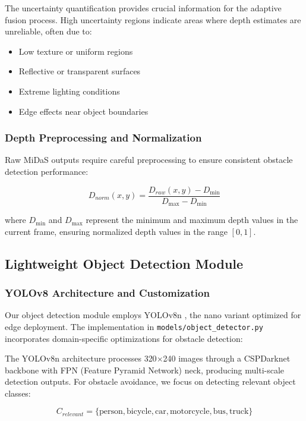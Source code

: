 \documentclass[12pt,oneside]{book}
\begin{document}
The uncertainty quantification provides crucial information for the adaptive fusion process. High uncertainty regions indicate areas where depth estimates are unreliable, often due to:
\begin{itemize}
\item Low texture or uniform regions
\item Reflective or transparent surfaces
\item Extreme lighting conditions
\item Edge effects near object boundaries
\end{itemize}

\subsubsection{Depth Preprocessing and Normalization}

Raw MiDaS outputs require careful preprocessing to ensure consistent obstacle detection performance:

\begin{equation}
D_{norm}(x,y) = \frac{D_{raw}(x,y) - D_{\min}}{D_{\max} - D_{\min}}
\label{eq:depth_normalization}
\end{equation}

where $D_{\min}$ and $D_{\max}$ represent the minimum and maximum depth values in the current frame, ensuring normalized depth values in the range $[0,1]$.

\subsection{Lightweight Object Detection Module}

\subsubsection{YOLOv8 Architecture and Customization}

Our object detection module employs YOLOv8n \cite{jocher2023ultralytics}, the nano variant optimized for edge deployment. The implementation in \texttt{models/object\_detector.py} incorporates domain-specific optimizations for obstacle detection:

The YOLOv8n architecture processes 320$\times$240 images through a CSPDarknet backbone with FPN (Feature Pyramid Network) neck, producing multi-scale detection outputs. For obstacle avoidance, we focus on detecting relevant object classes:

\begin{equation}
C_{relevant} = \{\text{person}, \text{bicycle}, \text{car}, \text{motorcycle}, \text{bus}, \text{truck}\}
\label{eq:relevant_classes}
\end{equation}
\end{document}

